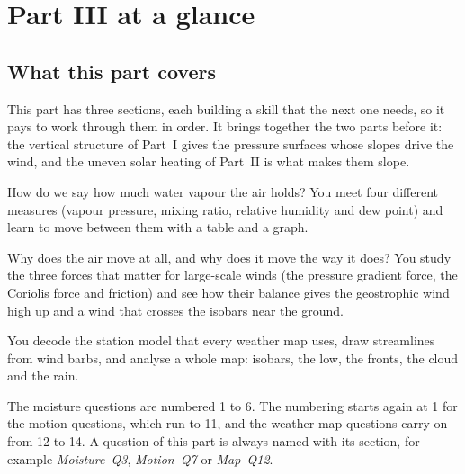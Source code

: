 \chapter{Part III at a glance}\label{p3-ch:glance}\label{p3-ch:orient}

\section{What this part covers}

This part has three sections, each building a skill that the next one needs, so it pays to work through them in order. It brings together the two parts before it: the vertical structure of Part~I gives the pressure surfaces whose slopes drive the wind, and the uneven solar heating of Part~II is what makes them slope.

\begin{description}[leftmargin=0pt,labelindent=0pt,font=\sffamily\bfseries]
\item[Moisture.] How do we say how much water vapour the air holds? You meet four different measures (vapour pressure, mixing ratio, relative humidity and dew point) and learn to move between them with a table and a graph.
\item[Motion.] Why does the air move at all, and why does it move the way it does? You study the three forces that matter for large-scale winds (the pressure gradient force, the Coriolis force and friction) and see how their balance gives the geostrophic wind high up and a wind that crosses the isobars near the ground.
\item[Weather maps.] You decode the station model that every weather map uses, draw streamlines from wind barbs, and analyse a whole map: isobars, the low, the fronts, the cloud and the rain.
\end{description}

The moisture questions are numbered 1 to 6. The numbering starts again at 1 for the motion questions, which run to 11, and the weather map questions carry on from 12 to 14. A question of this part is always named with its section, for example \emph{Moisture~Q3}, \emph{Motion~Q7} or \emph{Map~Q12}.

